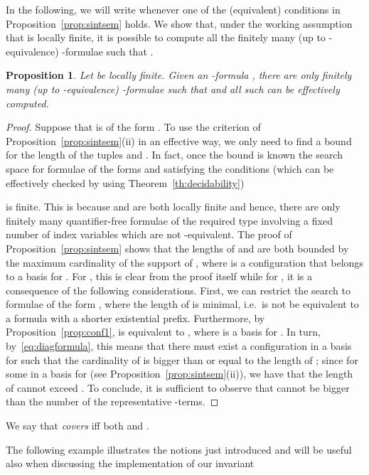 \documentclass{LMCS}
\theoremstyle{plain}\newtheorem{assumption}[thm]{Assumption}
\theoremstyle{plain}\newtheorem{proposition}[thm]{Proposition}
\theoremstyle{plain}\newtheorem{property}[thm]{Property}
\theoremstyle{plain}\newtheorem{example}[thm]{Example}
\theoremstyle{plain}\newtheorem{claim}[thm]{Claim}
\theoremstyle{plain}\newtheorem{lemma}[thm]{Lemma}
\begin{document}
In the following, we will write  whenever one of the
(equivalent) conditions in Proposition~\ref{prop:sintsem} holds. We
show that, under the working assumption that  is locally finite,
it is possible to compute all the finitely many (up to
-equivalence) -formulae  such that .
\begin{proposition}
  \label{prop:finitelymany}
  Let  be locally finite.  Given an -formula ,
  there are only finitely many (up to -equivalence)
  -formulae  such that  and all such  can be
  effectively computed.
\end{proposition}
\begin{proof}
  Suppose that  is of the form .  To use the
  criterion of Proposition~\ref{prop:sintsem}(ii) in an effective way,
  we only need to find a bound for the length of the tuples  and
  . In fact, once the bound is known the search space for
  formulae of the forms  and  satisfying the conditions (which can be effectively
  checked by using Theorem~\ref{th:decidability})
  
  is finite.  This is because  and  are both locally finite
  and hence, there are only finitely many quantifier-free formulae of
  the required type involving a fixed number of index variables which
  are not -equivalent. The proof of
  Proposition~\ref{prop:sintsem} shows that the lengths of  and
   are both bounded by the maximum cardinality  of the support
  of , where  is a configuration that belongs to a basis for
  .  For , this is clear from the
  proof itself while for , it is a consequence of the following
  considerations.  First, we can restrict the search to formulae 
  of the form , where the length of  is
  minimal, i.e.\  is not be equivalent to a formula with a shorter
  existential prefix.  Furthermore, by Proposition~\ref{prop:conf1},
   is equivalent to , where  is a basis for .  In turn,
  by~\eqref{eq:diagformula}, this means that there must exist a
  configuration  in a basis for  such that the cardinality of
   is bigger than or equal to the length of ; since  for some  in a basis for  (see
  Proposition~\ref{prop:sintsem}(ii)), we have that the length of
   cannot exceed .  To conclude, it is sufficient to observe
  that  cannot be bigger than the number of the representative
  -terms.
\end{proof}
\begin{defi}
  We say that \emph{ covers } iff both  and
  .
\end{defi}
The following example illustrates the notions just introduced and will
be useful also when discussing the implementation of our invariant
\end{document}
